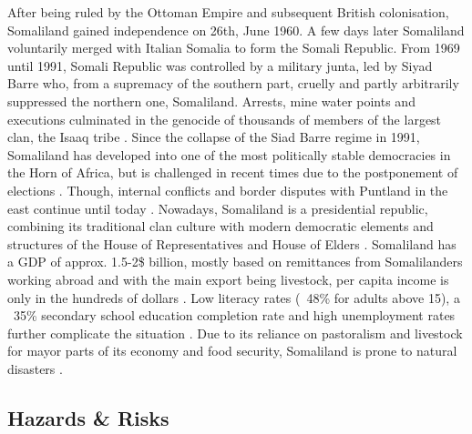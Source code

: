 After being ruled by the Ottoman Empire and subsequent British colonisation, Somaliland gained independence on 26th, June 1960. A few days later Somaliland voluntarily merged with Italian Somalia to form the Somali Republic. From 1969 until 1991, Somali Republic was controlled by a military junta, led by Siyad Barre who, from a supremacy of the southern part, cruelly and partly arbitrarily suppressed the northern one, Somaliland. Arrests, mine water points and executions culminated in the genocide of thousands of members of the largest clan, the Isaaq tribe \autocite{peiferStoppingMassKillings2009,republicofsomaliaCountryProfile20212021}. Since the collapse of the Siad Barre regime in 1991, Somaliland has developed into one of the most politically stable democracies in the Horn of Africa, but is challenged in recent times due to the postponement of elections \autocite{bbcSomalilandProfile2022, fortiPocketStabilityUnderstanding2011}. Though, internal conflicts and border disputes with Puntland in the east continue until today \autocite{filhoDEMOCRACYAFRICAOUTSTANDING2021}. Nowadays, Somaliland is a presidential republic, combining its traditional clan culture with modern democratic elements and structures of the House of Representatives and House of Elders \autocite{salemTerritorialDiagnosticReport2016}.\newline
Somaliland has a GDP of approx. 1.5-2\$ billion, mostly based on remittances from Somalilanders working abroad and with the main export being livestock, per capita income is only in the hundreds of dollars \autocite{klobucistaSomalilandHornAfrica2018, republicofsomaliaCountryProfile20212021, worldbankNewWorldBank2014}. Low literacy rates (~48\% for adults above 15), a ~35\% secondary school education completion rate and high unemployment rates further complicate the situation \autocite{republicofsomaliaCountryProfile20212021,worldbankNewWorldBank2014}. Due to its reliance on pastoralism and livestock for mayor parts of its economy and food security, Somaliland is prone to natural disasters \autocite{usaidEconomicsResilienceDrought2018}.


\subsection{Hazards \& Risks}

